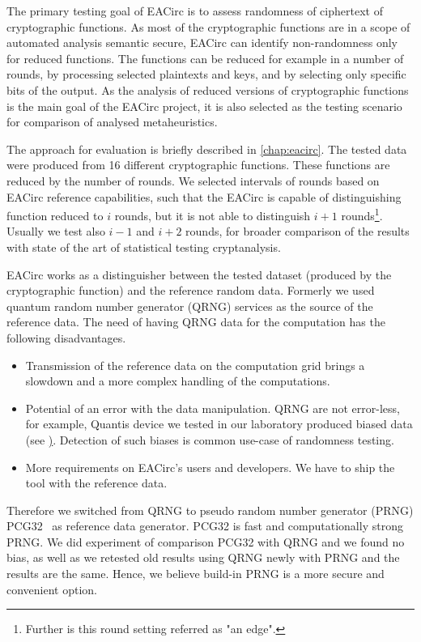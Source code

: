 \documentclass[
  print, %
  Table,   %
  nolof,     %
  nolot,     %
  11pt, %
  oneside  %
]{fithesis3}
\begin{document}
The primary testing goal of EACirc is to assess randomness of ciphertext of cryptographic functions. As most of the cryptographic functions are in a scope of automated analysis semantic secure, EACirc can identify non-randomness only for reduced functions. The functions can be reduced for example in a number of rounds, by processing selected plaintexts and keys, and by selecting only specific bits of the output. As the analysis of reduced versions of cryptographic functions is the main goal of the EACirc project, it is also selected as the testing scenario for comparison of analysed metaheuristics.

The approach for evaluation is briefly described in \cref{chap:eacirc}. The tested data were produced from 16 different cryptographic functions. These functions are reduced by the number of rounds. We selected intervals of rounds based on EACirc reference capabilities, such that the EACirc is capable of distinguishing function reduced to $i$ rounds, but it is not able to distinguish $i+1$ rounds\footnote{Further is this round setting referred as "an edge".}. Usually we test also $i-1$ and $i+2$ rounds, for broader comparison of the results with state of the art of statistical testing cryptanalysis.

EACirc works as a distinguisher between the tested dataset (produced by the cryptographic function) and the reference random data. Formerly we used quantum random number generator (QRNG) services as the source of the reference data. The need of having QRNG data for the computation has the following disadvantages.

\begin{itemize}
    \item Transmission of the reference data on the computation grid brings a slowdown and a more complex handling of the computations.
    \item Potential of an error with the data manipulation. QRNG are not error-less, for example, Quantis device we tested in our laboratory produced biased data (see \href{http://rtt.ics.muni.cz/ViewResults/Experiment/1732/}). Detection of such biases is common use-case of randomness testing.
    \item More requirements on EACirc's users and developers. We have to ship the tool with the reference data.
\end{itemize}

Therefore we switched from QRNG to pseudo random number generator (PRNG) PCG32~\cite{pcgGen} as reference data generator. PCG32 is fast and computationally strong PRNG. We did experiment of comparison PCG32 with QRNG and we found no bias, as well as we retested old results using QRNG newly with PRNG and the results are the same. Hence, we believe build-in PRNG is a more secure and convenient option.
\end{document}
